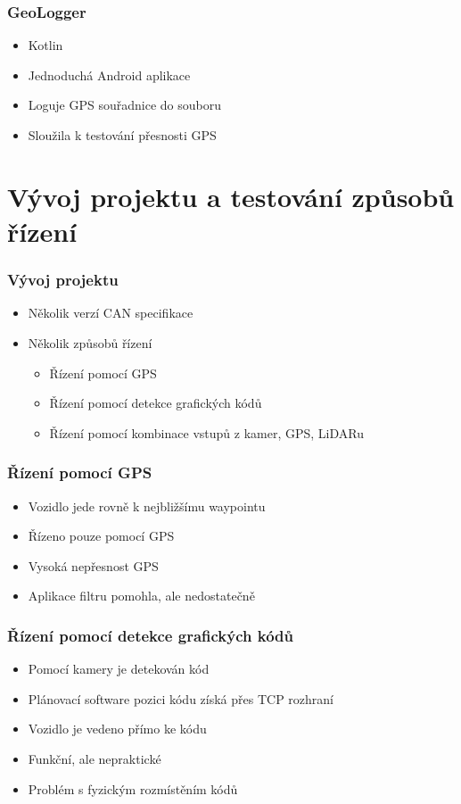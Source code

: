 \documentclass{beamer}
\begin{document}
\begin{frame}
    \frametitle{GeoLogger}
    \begin{itemize}
        \item Kotlin
        \item Jednoduchá Android aplikace
        \item Loguje GPS souřadnice do souboru
        \item Sloužila k testování přesnosti GPS
    \end{itemize}
\end{frame}

\section{Vývoj projektu a testování způsobů řízení}

\begin{frame}
    \frametitle{Vývoj projektu}
    \begin{itemize}
        \item Několik verzí CAN specifikace
        \item Několik způsobů řízení
            \begin{itemize}
                \item Řízení pomocí GPS
                \item Řízení pomocí detekce grafických kódů
                \item Řízení pomocí kombinace vstupů z kamer, GPS, LiDARu
            \end{itemize}
    \end{itemize}
\end{frame}

\begin{frame}
    \frametitle{Řízení pomocí GPS}
    \begin{itemize}
        \item Vozidlo jede rovně k nejbližšímu waypointu
        \item Řízeno pouze pomocí GPS
        \item Vysoká nepřesnost GPS
        \item Aplikace filtru pomohla, ale nedostatečně
    \end{itemize}
\end{frame}

\begin{frame}
    \frametitle{Řízení pomocí detekce grafických kódů}
    \begin{itemize}
        \item Pomocí kamery je detekován kód
        \item Plánovací software pozici kódu získá přes TCP rozhraní
        \item Vozidlo je vedeno přímo ke kódu
        \item Funkční, ale nepraktické
        \item Problém s fyzickým rozmístěním kódů
    \end{itemize}
\end{frame}
\end{document}
